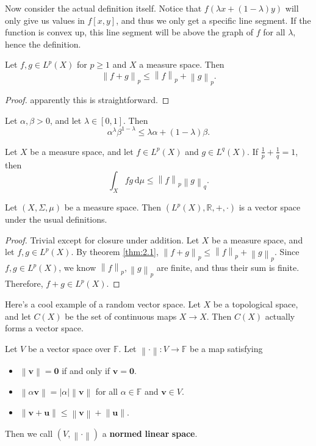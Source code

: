 \documentclass[11pt, letterpaper]{report}
\begin{document}
Now consider the actual definition itself. Notice that $f(\lambda x+(1-\lambda )y)$ will only give us values in $f[x,y]$, and thus we only get a specific line segment. If the function is convex up, this line segment will be above the graph of $f$ for all $\lambda $, hence the definition.
\begin{theorem}\label{thm:2.1}
	Let $f,g\in L^p(X)$ for $p\geq 1$ and $X$ a measure space. Then
	\[
		\left\lVert f+g \right\rVert _p\leq \left\lVert f \right\rVert _p+\left\lVert g \right\rVert _p
	.\]
\end{theorem}
\begin{proof}
	apparently this is straightforward.
\end{proof}
\begin{lemma}\label{lma:2.1}
	Let $\alpha ,\beta >0$, and let $\lambda \in[0,1]$. Then
	\[
		\alpha^\lambda \beta ^{1-\lambda }\leq \lambda \alpha +\left( 1-\lambda  \right) \beta 
	.\]
\end{lemma}
\begin{theorem}\label{thm:2.2}
	Let $X$ be a measure space, and let $f\in L^p(X)$ and $g\in L^q(X)$. If $\frac{1}{p}+\frac{1}{q}=1$, then
	\[
		\int_X fg \,\mathrm{d} \mu \leq \left\lVert f \right\rVert _p\left\lVert g \right\rVert _q
	.\]
\end{theorem}
\begin{proposition}\label{pro:2.1}
	Let $(X,\Sigma ,\mu )$ be a measure space. Then $\left( L^p(X),\mathbb{R},+,\cdot  \right) $ is a vector space under the usual definitions.
\end{proposition}
\begin{proof}
	Trivial except for closure under addition. Let $X$ be a measure space, and let $f,g \in L^p(X)$. By theorem \ref{thm:2.1}, $\left\lVert f+g \right\rVert_p\leq \left\lVert f \right\rVert _p+\left\lVert g \right\rVert _p$. Since $f,g\in L^p(X)$, we know $\left\lVert f \right\rVert _p,\left\lVert g \right\rVert _p$ are finite, and thus their sum is finite. Therefore, $f+g\in L^p(X)$.
\end{proof}
Here's a cool example of a random vector space. Let $X$ be a topological space, and let $C(X)$ be the set of continuous maps $X\to X$. Then $C(X)$ actually forms a vector space.
\begin{definition}\label{dfn:2.6}
	Let $V$ be a vector space over $\mathbb{F}$. Let $\left\lVert \cdot  \right\rVert : V \to \mathbb{F}$ be a map satisfying
	\begin{itemize}
		\item $\left\lVert \mathbf{v} \right\rVert =\mathbf{0}$ if and only if $\mathbf{v}=\mathbf{0}$.
		\item $\left\lVert \alpha \mathbf{v} \right\rVert =\left| \alpha  \right| \left\lVert \mathbf{v} \right\rVert $ for all $\alpha \in\mathbb{F}$ and $\mathbf{v}\in V$.
		\item $\left\lVert \mathbf{v}+\mathbf{u} \right\rVert \leq \left\lVert \mathbf{v} \right\rVert +\left\lVert \mathbf{u} \right\rVert $.
	\end{itemize}
	Then we call $(V,\left\lVert \cdot  \right\rVert )$ a \textbf{normed} \textbf{linear} \textbf{space}.
\end{definition}
\end{document}
